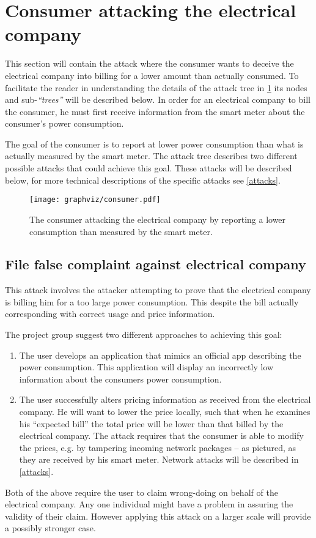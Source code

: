 
\section{Consumer attacking the electrical company}\label{attacks:consumer_vs_electrical}
This section will contain the attack where the consumer wants to deceive the electrical company into billing for a lower amount than actually consumed.
To facilitate the reader in understanding the details of the attack tree in \cref{report_power_attack_tree} its nodes and sub-\emph{``trees''} will be described below.
In order for an electrical company to bill the consumer, he must first receive information from the smart meter about the consumer's power consumption.

The goal of the consumer is to report at lower power consumption than what is actually measured by the smart meter.
The attack tree describes two different possible attacks that could achieve this goal.
These attacks will be described below, for more technical descriptions of the specific attacks see \cref{attacks}.

\begin{figure}[H]
  \texttt{[image: graphviz/consumer.pdf]}
  \caption{The consumer attacking the electrical company by reporting a lower consumption than measured by the smart meter.}
  \label{report_power_attack_tree}
\end{figure}

\subsection{File false complaint against electrical company}
This attack involves the attacker attempting to prove that the electrical company is billing him for a too large power consumption.
This despite the bill actually corresponding with correct usage and price information.

The project group suggest two different approaches to achieving this goal:
\begin{enumerate}
  \item The user develops an application that mimics an official app describing the power consumption.
  This application will display an incorrectly low information about the consumers power consumption.
  \item The user successfully alters pricing information as received from the electrical company.
  He will want to lower the price locally, such that when he examines his ``expected bill'' the total price will be lower than that billed by the electrical company.
  The attack requires that the consumer is able to modify the prices, e.g. by tampering incoming network packages -- as pictured, as they are received by his smart meter.
  Network attacks will be described in \cref{attacks}.
\end{enumerate}
Both of the above require the user to claim wrong-doing on behalf of the electrical company.
Any one individual might have a problem in assuring the validity of their claim.
However applying this attack on a larger scale will provide a possibly stronger case.

